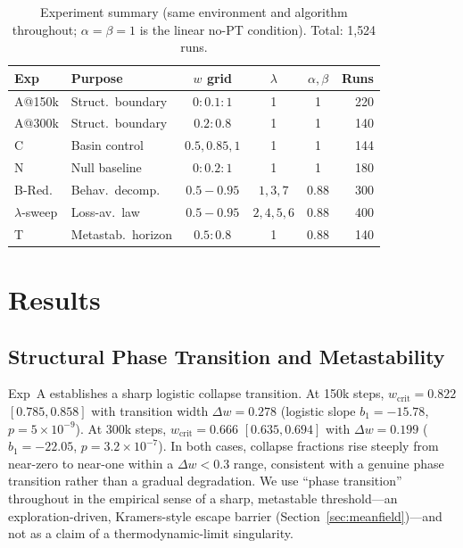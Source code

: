 \documentclass[letterpaper]{article}
\theoremstyle{plain}
\newcommand{\wcrit}{w_{\mathrm{crit}}}
\begin{document}
\begin{table}[t]
\centering
\caption{Experiment summary (same environment and algorithm throughout;
$\alpha{=}\beta{=}1$ is the linear no-PT condition). Total: 1{,}524 runs.}
\label{tab:experiments}
\footnotesize
\setlength{\tabcolsep}{3.5pt}
\begin{tabular}{llcccr}
\toprule
Exp & Purpose & $w$ grid & $\lambda$ & $\alpha,\beta$ & Runs \\
\midrule
A@150k  & Struct.\ boundary  & $0{:}0.1{:}1$ & 1 & 1 & 220 \\
A@300k  & Struct.\ boundary  & $0.2{:}0.8$   & 1 & 1 & 140 \\
C       & Basin control      & $0.5,0.85,1$  & 1 & 1 & 144 \\
N       & Null baseline      & $0{:}0.2{:}1$ & 1 & 1 & 180 \\
B-Red.  & Behav.\ decomp.    & $0.5{-}0.95$  & $1,3,7$ & 0.88 & 300 \\
$\lambda$-sweep & Loss-av.\ law & $0.5{-}0.95$ & $2,4,5,6$ & 0.88 & 400 \\
T       & Metastab.\ horizon & $0.5{:}0.8$   & 1 & 0.88 & 140 \\
\bottomrule
\end{tabular}
\end{table}

\section{Results}
\label{sec:results}

\subsection{Structural Phase Transition and Metastability}
\label{sec:results_structural}

Exp~A establishes a sharp logistic collapse transition.
At 150k steps, $\wcrit = 0.822$ $[0.785, 0.858]$ with transition width
$\Delta w = 0.278$ (logistic slope $b_1 = -15.78$, $p = 5 \times 10^{-9}$).
At 300k steps, $\wcrit = 0.666$ $[0.635, 0.694]$ with $\Delta w = 0.199$
($b_1 = -22.05$, $p = 3.2 \times 10^{-7}$).
In both cases, collapse fractions rise steeply from near-zero to near-one
within a $\Delta w < 0.3$ range, consistent with a genuine phase
transition rather than a gradual degradation.
We use ``phase transition'' throughout in the empirical sense of a sharp,
metastable threshold---an exploration-driven, Kramers-style escape barrier
(Section~\ref{sec:meanfield})---and not as a claim of a thermodynamic-limit
singularity.
\end{document}
